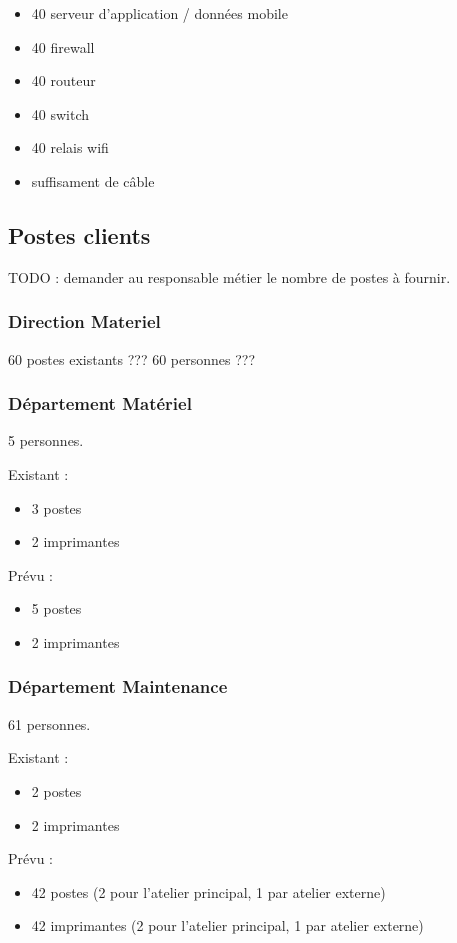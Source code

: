             \begin{itemize}
	            \item 40 serveur d'application / données mobile
                \item 40 firewall
	            \item 40 routeur
	            \item 40 switch
	            \item 40 relais wifi
                \item suffisament de câble
            \end{itemize}

   \subsection{Postes clients}

        TODO : demander au responsable métier le nombre de postes à fournir.

        \subsubsection{Direction Materiel}
            60 postes existants ??? 60 personnes ???

        \subsubsection{Département Matériel}
            5 personnes.

            Existant :
                \begin{itemize}
                    \item 3 postes
                    \item 2 imprimantes
                \end{itemize}
            Prévu :
                \begin{itemize}
                    \item 5 postes
                    \item 2 imprimantes
                \end{itemize}

        \subsubsection{Département Maintenance}
            61 personnes.

            Existant :
                \begin{itemize}
                    \item 2 postes
                    \item 2 imprimantes
                \end{itemize}
            Prévu :
                \begin{itemize}
                    \item 42 postes (2 pour l'atelier principal, 1 par atelier externe)
                    \item 42 imprimantes (2 pour l'atelier principal, 1 par atelier externe)
                \end{itemize}



